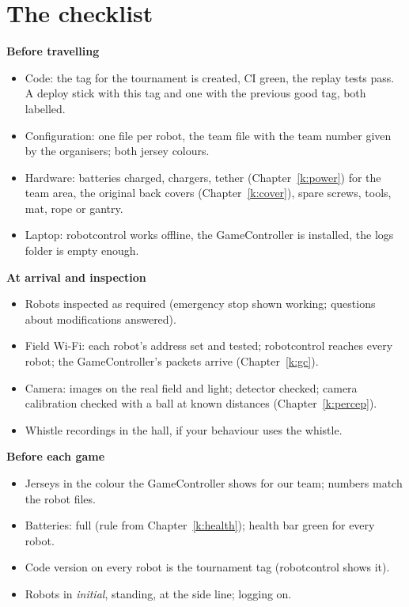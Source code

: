 \section*{The checklist}
\textbf{Before travelling}
\begin{itemize}[nosep]
  \item[$\square$] Code: the tag for the tournament is created, CI green, the replay tests pass. A deploy stick with this tag and one with the previous good tag, both labelled.
  \item[$\square$] Configuration: one file per robot, the team file with the team number given by the organisers; both jersey colours.
  \item[$\square$] Hardware: batteries charged, chargers, tether (Chapter~\ref{k:power}) for the team area, the original back covers (Chapter~\ref{k:cover}), spare screws, tools, mat, rope or gantry.
  \item[$\square$] Laptop: robotcontrol works offline, the GameController is installed, the logs folder is empty enough.
\end{itemize}
\textbf{At arrival and inspection}
\begin{itemize}[nosep]
  \item[$\square$] Robots inspected as required (emergency stop shown working; questions about modifications answered).
  \item[$\square$] Field Wi-Fi: each robot's address set and tested; robotcontrol reaches every robot; the GameController's packets arrive (Chapter~\ref{k:gc}).
  \item[$\square$] Camera: images on the real field and light; detector checked; camera calibration checked with a ball at known distances (Chapter~\ref{k:percep}).
  \item[$\square$] Whistle recordings in the hall, if your behaviour uses the whistle.
\end{itemize}
\textbf{Before each game}
\begin{itemize}[nosep]
  \item[$\square$] Jerseys in the colour the GameController shows for our team; numbers match the robot files.
  \item[$\square$] Batteries: full (rule from Chapter~\ref{k:health}); health bar green for every robot.
  \item[$\square$] Code version on every robot is the tournament tag (robotcontrol shows it).
  \item[$\square$] Robots in \emph{initial}, standing, at the side line; logging on.
\end{itemize}
